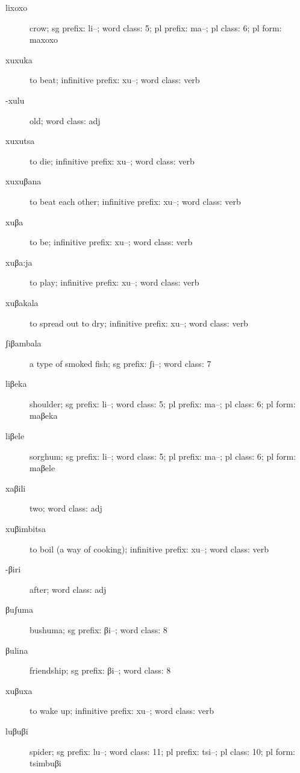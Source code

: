 \begin{description}
\item[lixoxo]crow; sg prefix: li--; word class: 5; pl prefix: ma--; pl class: 6; pl form: maxoxo
\item[xuxuka]to beat; infinitive prefix: xu--; word class: verb
\item[-xulu]old; word class: adj
\item[xuxutsa]to die; infinitive prefix: xu--; word class: verb
\item[xuxuβana]to beat each other; infinitive prefix: xu--; word class: verb
\item[xuβa]to be; infinitive prefix: xu--; word class: verb
\item[xuβa:ja]to play; infinitive prefix: xu--; word class: verb
\item[xuβakala]to spread out to dry; infinitive prefix: xu--; word class: verb
\item[ʃiβambala]a type of smoked fish; sg prefix: ʃi--; word class: 7
\item[liβeka]shoulder; sg prefix: li--; word class: 5; pl prefix: ma--; pl class: 6; pl form: maβeka
\item[liβele]sorghum; sg prefix: li--; word class: 5; pl prefix: ma--; pl class: 6; pl form: maβele
\item[xaβili]two; word class: adj
\item[xuβimbitsa]to boil (a way of cooking); infinitive prefix: xu--; word class: verb
\item[-βiri]after; word class: adj
\item[βuʃuma]bushuma; sg prefix: βi--; word class: 8
\item[βulina]friendship; sg prefix: βi--; word class: 8
\item[xuβuxa]to wake up; infinitive prefix: xu--; word class: verb
\item[luβuβi]spider; sg prefix: lu--; word class: 11; pl prefix: tsi--; pl class: 10; pl form: tsimbuβi
\end{description}
%